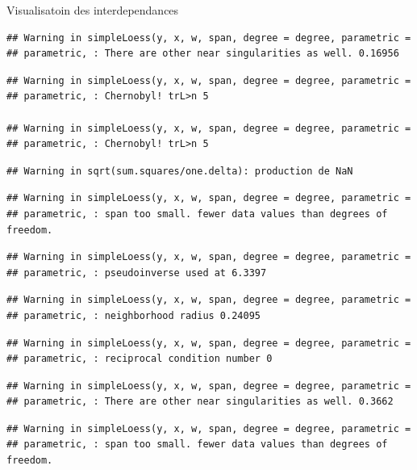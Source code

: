\documentclass[11pt,ignorenonframetext,]{beamer}
\begin{document}
\begin{frame}[fragile]{Visualisatoin des interdependances}
\begin{verbatim}
## Warning in simpleLoess(y, x, w, span, degree = degree, parametric =
## parametric, : There are other near singularities as well. 0.16956
\end{verbatim}

\begin{verbatim}
## Warning in simpleLoess(y, x, w, span, degree = degree, parametric =
## parametric, : Chernobyl! trL>n 5

## Warning in simpleLoess(y, x, w, span, degree = degree, parametric =
## parametric, : Chernobyl! trL>n 5
\end{verbatim}

\begin{verbatim}
## Warning in sqrt(sum.squares/one.delta): production de NaN
\end{verbatim}

\begin{verbatim}
## Warning in simpleLoess(y, x, w, span, degree = degree, parametric =
## parametric, : span too small. fewer data values than degrees of freedom.
\end{verbatim}

\begin{verbatim}
## Warning in simpleLoess(y, x, w, span, degree = degree, parametric =
## parametric, : pseudoinverse used at 6.3397
\end{verbatim}

\begin{verbatim}
## Warning in simpleLoess(y, x, w, span, degree = degree, parametric =
## parametric, : neighborhood radius 0.24095
\end{verbatim}

\begin{verbatim}
## Warning in simpleLoess(y, x, w, span, degree = degree, parametric =
## parametric, : reciprocal condition number 0
\end{verbatim}

\begin{verbatim}
## Warning in simpleLoess(y, x, w, span, degree = degree, parametric =
## parametric, : There are other near singularities as well. 0.3662
\end{verbatim}

\begin{verbatim}
## Warning in simpleLoess(y, x, w, span, degree = degree, parametric =
## parametric, : span too small. fewer data values than degrees of freedom.
\end{verbatim}


\end{frame}
\end{document}
